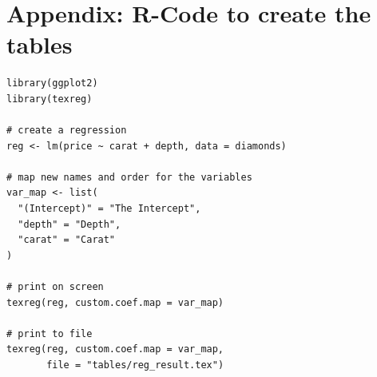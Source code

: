 \documentclass[12pt,a4paper]{article}
\begin{document}
\newpage

\printbibliography

\newpage

\section{Appendix: R-Code to create the tables}
\label{sec:appendix}
\begin{verbatim}
library(ggplot2)
library(texreg)

# create a regression
reg <- lm(price ~ carat + depth, data = diamonds)

# map new names and order for the variables
var_map <- list(
  "(Intercept)" = "The Intercept",
  "depth" = "Depth",
  "carat" = "Carat"
)

# print on screen
texreg(reg, custom.coef.map = var_map)

# print to file
texreg(reg, custom.coef.map = var_map,
       file = "tables/reg_result.tex")
\end{verbatim}

\newpage

\end{document}
